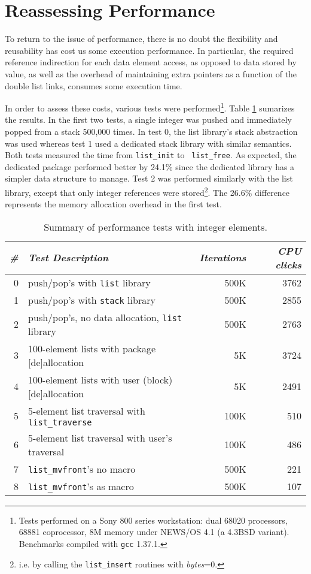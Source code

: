 \documentclass[fullpage,11pt]{article}
\begin{document}
\section{Reassessing Performance}
To return to the issue of performance, there is no doubt the flexibility and
reusability has cost us some execution performance.  In particular, the
required reference indirection for each data element access, as opposed to
data stored by value, as well as the overhead of maintaining extra pointers
as a function of the double list links, consumes some execution time.

In order to assess these costs, various tests were performed\footnote{Tests
performed on a Sony 800 series workstation: dual 68020 processors, 68881
coprocessor, 8M memory under NEWS/OS 4.1 (a 4.3BSD variant).  Benchmarks
compiled with {\tt gcc} 1.37.1.}.  Table \ref{performance} sumarizes the
results.  In the first two tests, a single integer was pushed and immediately
popped from a stack 500,000 times.  In test 0, the list library's stack
abstraction was used whereas test 1 used a dedicated stack library with
similar semantics.  Both tests measured the time from {\tt list\_init} to {\tt
list\_free}.  As expected, the dedicated package performed better by 24.1\%
since the dedicated library has a simpler data structure to manage.  Test 2
was performed similarly with the list library, except that only integer
references were stored\footnote{i.e.  by calling the {\tt list\_insert}
routines with {\em bytes}=0.}.  The 26.6\% difference represents the memory
allocation overhead in the first test.

\begin{table}[t]
\begin{center}
\begin{tabular}{|r|l|r|r|} \hline
{\em \#} & {\em Test Description} & {\em Iterations} & {\em CPU clicks} \\ 
	\hline \hline
0 & push/pop's with {\tt list} library                 & 500K & 3762 \\ \hline
1 & push/pop's with {\tt stack} library                & 500K & 2855 \\ \hline
2 & push/pop's, no data allocation, {\tt list} library & 500K & 2763 \\ \hline
3 & 100-element lists with package [de]allocation      &   5K & 3724 \\ \hline
4 & 100-element lists with user (block) [de]allocation &   5K & 2491 \\ \hline
5 & 5-element list traversal with {\tt list\_traverse} & 100K &  510 \\ \hline
6 & 5-element list traversal with user's traversal     & 100K &  486 \\ \hline
7 & {\tt list\_mvfront}'s no macro                     & 500K &  221 \\ \hline
8 & {\tt list\_mvfront}'s as macro                     & 500K &  107 \\ \hline
\end{tabular}
\caption{Summary of performance tests with integer elements.}
\label{performance}
\end{center}
\end{table}
\end{document}
